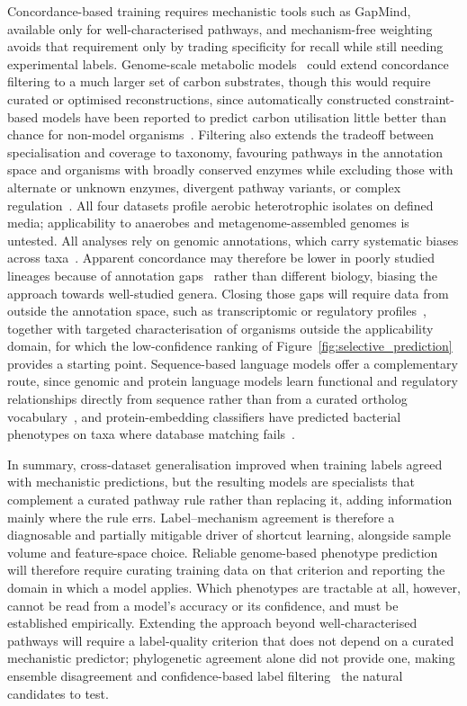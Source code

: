 Concordance-based training requires mechanistic tools such as GapMind, available only for well-characterised pathways, and mechanism-free weighting avoids that requirement only by trading specificity for recall while still needing experimental labels.
Genome-scale metabolic models~\cite{Seaver2021ModelSEED,Faria2018Reconstruction} could extend concordance filtering to a much larger set of carbon substrates, though this would require curated or optimised reconstructions, since automatically constructed constraint-based models have been reported to predict carbon utilisation little better than chance for non-model organisms~\cite{Li2023-up}.
Filtering also extends the tradeoff between specialisation and coverage to taxonomy, favouring pathways in the annotation space and organisms with broadly conserved enzymes while excluding those with alternate or unknown enzymes, divergent pathway variants, or complex regulation~\cite{Soucy2015HGT,Glasner2020Promiscuity,Gorke2008CCR}.
All four datasets profile aerobic heterotrophic isolates on defined media; applicability to anaerobes and metagenome-assembled genomes is untested.
All analyses rely on genomic annotations, which carry systematic biases across taxa~\cite{Karlsen2023Genotype,Schnoes2009Annotation,Lobb2020AnnotationCoverage}.
Apparent concordance may therefore be lower in poorly studied lineages because of annotation gaps~\cite{Price2018MutantPhenotypes} rather than different biology, biasing the approach towards well-studied genera.
Closing those gaps will require data from outside the annotation space, such as transcriptomic or regulatory profiles~\cite{Arikan2023MultiOmics,Faria2014Regulatory}, together with targeted characterisation of organisms outside the applicability domain, for which the low-confidence ranking of Figure~\ref{fig:selective_prediction} provides a starting point.
Sequence-based language models offer a complementary route, since genomic and protein language models learn functional and regulatory relationships directly from sequence rather than from a curated ortholog vocabulary~\cite{Nguyen2024Evo,Hwang2024GenomicLM}, and protein-embedding classifiers have predicted bacterial phenotypes on taxa where database matching fails~\cite{FerrerFlorensa2026PathogenFinder}.

In summary, cross-dataset generalisation improved when training labels agreed with mechanistic predictions, but the resulting models are specialists that complement a curated pathway rule rather than replacing it, adding information mainly where the rule errs.
Label--mechanism agreement is therefore a diagnosable and partially mitigable driver of shortcut learning, alongside sample volume and feature-space choice.
Reliable genome-based phenotype prediction will therefore require curating training data on that criterion and reporting the domain in which a model applies.
Which phenotypes are tractable at all, however, cannot be read from a model's accuracy or its confidence, and must be established empirically.
Extending the approach beyond well-characterised pathways will require a label-quality criterion that does not depend on a curated mechanistic predictor; phylogenetic agreement alone did not provide one, making ensemble disagreement and confidence-based label filtering~\cite{Northcutt2021Confident} the natural candidates to test.
